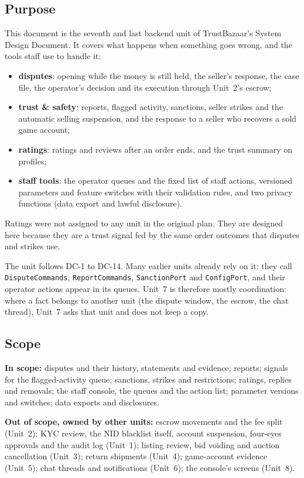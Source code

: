 \documentclass[11pt,a4paper]{article}
\begin{document}
\subsection{Purpose}
This document is the seventh and last backend unit of TrustBazaar's System Design Document. It covers what happens when something goes wrong, and the tools staff use to handle it:
\begin{itemize}[nosep]
  \item \textbf{disputes}: opening while the money is still held, the seller's response, the case file, the operator's decision and its execution through Unit~2's escrow;
  \item \textbf{trust \& safety}: reports, flagged activity, sanctions, seller strikes and the automatic selling suspension, and the response to a seller who recovers a sold game account;
  \item \textbf{ratings}: ratings and reviews after an order ends, and the trust summary on profiles;
  \item \textbf{staff tools}: the operator queues and the fixed list of staff actions, versioned parameters and feature switches with their validation rules, and two privacy functions (data export and lawful disclosure).
\end{itemize}
Ratings were not assigned to any unit in the original plan. They are designed here because they are a trust signal fed by the same order outcomes that disputes and strikes use.

The unit follows DC-1 to DC-14. Many earlier units already rely on it: they call \texttt{DisputeCommands}, \texttt{ReportCommands}, \texttt{SanctionPort} and \texttt{ConfigPort}, and their operator actions appear in its queues. Unit~7 is therefore mostly coordination: where a fact belongs to another unit (the dispute window, the escrow, the chat thread), Unit~7 asks that unit and does not keep a copy.

\subsection{Scope}
\textbf{In scope:} disputes and their history, statements and evidence; reports; signals for the flagged-activity queue; sanctions, strikes and restrictions; ratings, replies and removals; the staff console, the queues and the action list; parameter versions and switches; data exports and disclosures.

\textbf{Out of scope, owned by other units:} escrow movements and the fee split (Unit~2); KYC review, the NID blacklist itself, account suspension, four-eyes approvals and the audit log (Unit~1); listing review, bid voiding and auction cancellation (Unit~3); return shipments (Unit~4); game-account evidence (Unit~5); chat threads and notifications (Unit~6); the console's screens (Unit~8).
\end{document}
